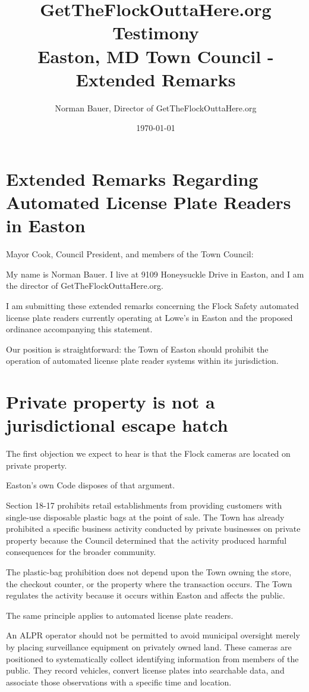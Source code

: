 \documentclass[11pt]{article}
\author{Norman Bauer, Director of GetTheFlockOuttaHere.org}
\date{\today}
\title{GetTheFlockOuttaHere.org Testimony\\\medskip
\large Easton, MD Town Council - Extended Remarks}
\begin{document}
\maketitle
\setcounter{tocdepth}{2}
\tableofcontents

\RaggedRight

\section*{Extended Remarks Regarding Automated License Plate Readers in Easton}
\label{sec:orgc5fd4f2}

Mayor Cook, Council President, and members of the Town Council:

My name is Norman Bauer. I live at 9109 Honeysuckle Drive in Easton, and I am the director of GetTheFlockOuttaHere.org.

I am submitting these extended remarks concerning the Flock Safety automated license plate readers currently operating at Lowe’s in Easton and the proposed ordinance accompanying this statement.

Our position is straightforward: the Town of Easton should prohibit the operation of automated license plate reader systems within its jurisdiction.

\section*{Private property is not a jurisdictional escape hatch}
\label{sec:org11b81ef}

The first objection we expect to hear is that the Flock cameras are located on private property.

Easton’s own Code disposes of that argument.

Section 18-17 prohibits retail establishments from providing customers with single-use disposable plastic bags at the point of sale. The Town has already prohibited a specific business activity conducted by private businesses on private property because the Council determined that the activity produced harmful consequences for the broader community.

The plastic-bag prohibition does not depend upon the Town owning the store, the checkout counter, or the property where the transaction occurs. The Town regulates the activity because it occurs within Easton and affects the public.

The same principle applies to automated license plate readers.

An ALPR operator should not be permitted to avoid municipal oversight merely by placing surveillance equipment on privately owned land. These cameras are positioned to systematically collect identifying information from members of the public. They record vehicles, convert license plates into searchable data, and associate those observations with a specific time and location.
\end{document}
